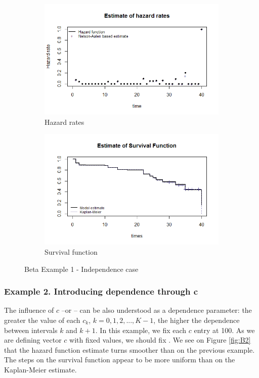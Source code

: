 \documentclass[letterpaper]{article}\usepackage[]{graphicx}\usepackage[]{color}
\begin{document}
\begin{figure}
  \centering
  \begin{subfigure}[a]{\textwidth}\centering
    \includegraphics[width=\textwidth]{B11.png}
    \caption{Hazard rates}
  \end{subfigure}
  \begin{subfigure}[b]{\textwidth}\centering
    \includegraphics[width=\textwidth]{B12.png}
    \caption{Survival function}
  \end{subfigure}
  \caption{Beta Example 1 - Independence case}
  \label{fig:B1}
\end{figure}
 
\subsubsection{Example 2. Introducing dependence through c}

The influence of $c$ --or -- can be also understood as a dependence parameter: the greater the value of each $c_k$, $k=0,1,2,...,K-1$, the higher the dependence between intervals $k$ and $k+1$. In this example, we fix each $c$ entry at 100. As we are defining vector $c$ with fixed values, we should fix . We see on Figure \ref{fig:B2} that the hazard function estimate turns smoother than on the previous example. The steps on the survival function appear to be more uniform than on the Kaplan-Meier estimate. 
 
\end{document}
